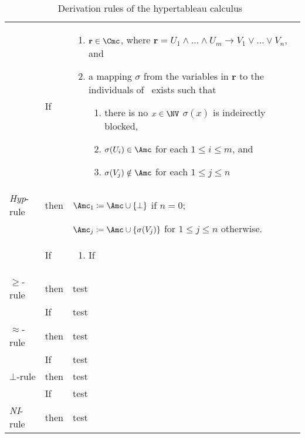 \begin{table}
  \caption{Derivation rules of the hypertableau calculus~\cite{MoSH-JAIR09}}
  \label{tab:derivation-rules}
  \centering
  \begin{tabularx}{0.9\linewidth}{ll@{ }X}
    \toprule
    & If &  \vspace*{-0.88\topsep}
           \begin{enumerate}[nosep,leftmargin=\widthof{3.}+\labelsep,topsep=0pt]
           \item $\mathbf{r} \in \Cmc$, where $\mathbf{r} = U_{1} \land\dots\land U_{m} \to V_{1}
             \lor\dots\lor V_{n}$, and
           \item a mapping $\sigma$ from the variables in $\mathbf{r}$ to the individuals of~\A
             exists such that 
             \begin{enumerate}[nosep,label*=\arabic*.,topsep=0pt]
             \item there is no $x\in\NV$ $\sigma(x)$ is indeirectly blocked,
             \item $\sigma(U_{i})\in\A$ for each $1\leq i \leq m$, and
             \item $\sigma(V_{j})\notin\A$ for each $1\leq j \leq n$
             \end{enumerate}%
           \end{enumerate} \\ 
    \multirow{-3}{*}[7ex]{\textit{Hyp}-rule} & then &
        $\A_{1} \coloneqq \A \cup \{\bot\}$ if $n=0$; \\
    & & $\A_{j} \coloneqq \A \cup \{\sigma(V_{j})\}$ for $1 \leq j \leq n$ otherwise.
      \\ \midrule
    & If & \vspace*{-0.88\topsep}
           \begin{enumerate}[nosep]
           \item If
           \end{enumerate}
 \\
    \multirow{-2}{*}{$\geq$-rule} & then & test \\ \midrule
    & If & test\\
    \multirow{-2}{*}{$\approx$-rule} & then & 
       test \\ \midrule
    & If & test \\
    \multirow{-2}{*}{$\bot$-rule} & then &  test \\ \midrule
    & If & test \\
    \multirow{-2}{*}{\textit{NI}-rule} & then & test \\
    \bottomrule
  \end{tabularx}
\end{table}

